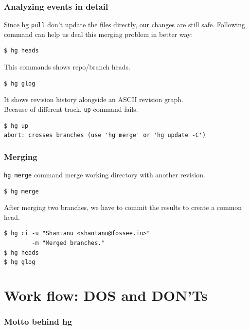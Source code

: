 \documentclass[14pt,compress]{beamer}
\newcounter{time}
\newcommand{\inctime}[1]{\addtocounter{time}{#1}{\tiny \thetime\ m}}
\newcommand{\typ}[1]{\lstinline{#1}}
\begin{document}
\begin{frame}[fragile]
  \frametitle{Analyzing events in detail}
  Since hg \typ{pull} don't update the files directly, our changes are still safe. Following command can help us deal this merging problem in better way:
  \begin{lstlisting}
$ hg heads
  \end{lstlisting}
  This commands shows repo/branch heads.
  \begin{lstlisting}
$ hg glog    
  \end{lstlisting}
  It shows revision history alongside an ASCII revision graph.\\
  Because of different track, \typ{up} command fails.
  \begin{lstlisting}
$ hg up
abort: crosses branches (use 'hg merge' or 'hg update -C')
  \end{lstlisting} %
\end{frame}

\begin{frame}[fragile]
  \frametitle{Merging}
  \typ{hg merge} command merge working directory with another revision.
  \begin{lstlisting}
$ hg merge    
  \end{lstlisting} %
  After merging two branches, we have to commit the results to create a common head.
  \begin{lstlisting}
$ hg ci -u "Shantanu <shantanu@fossee.in>" 
        -m "Merged branches."
$ hg heads    
$ hg glog
  \end{lstlisting} %
  \inctime{15}
\end{frame}

\section{Work flow: DOS and DON'Ts}

\begin{frame}
  \frametitle{Motto behind hg}
  \begin{center}
  \color{red}{``Commit Early Commit Often.''}\\  
  \end{center}  
\end{frame}
\end{document}
